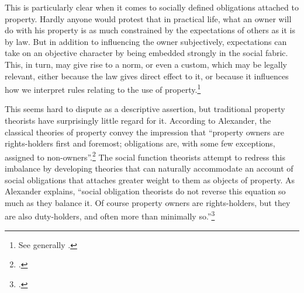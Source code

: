 This is particularly clear when it comes to socially defined obligations attached to property. Hardly anyone would protest that in practical life, what an owner will do with his property is as much constrained by the expectations of others as it is by law. But in addition to influencing the owner subjectively, expectations can take on an objective character by being embedded strongly in the social fabric. This, in turn, may give rise to a norm, or even a custom, which may be legally relevant, either because the law gives direct effect to it, or because it influences how we interpret rules relating to the use of property.\footnote{See generally \cite{penalver09,alexander09}.}

This seems hard to dispute as a descriptive assertion, but traditional property theorists have surprisingly little regard for it. According to Alexander, the classical theories of property convey the impression that ``property owners are rights-holders first and foremost; obligations are, with some few exceptions, assigned to non-owners''.\footcite[1023]{alexander11} The social function theorists attempt to redress this imbalance by developing theories that can naturally accommodate an account of social obligations that attaches greater weight to them as objects of property. As Alexander explains, ``social obligation theorists do not reverse this equation so much as they balance it. Of course property owners are rights-holders, but they are also duty-holders, and often more than minimally so.''\footcite[1023]{alexander11} 

